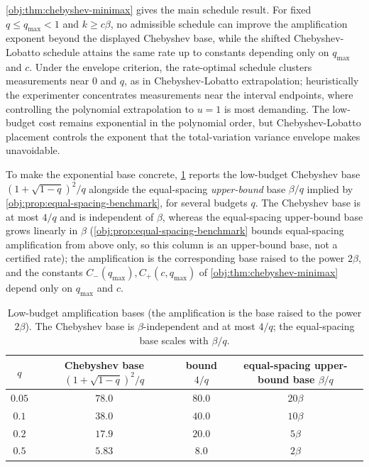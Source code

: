 \documentclass[11pt]{article}
\begin{document}
\cref{obj:thm:chebyshev-minimax} gives the main schedule result. For fixed \(q\le q_{\max}<1\) and \(k\ge c\beta\), no admissible schedule can improve the amplification exponent beyond the displayed Chebyshev base, while the shifted Chebyshev-Lobatto schedule attains the same rate up to constants depending only on \(q_{\max}\) and \(c\). Under the envelope criterion, the rate-optimal schedule clusters measurements near \(0\) and \(q\), as in Chebyshev-Lobatto extrapolation; heuristically the experimenter concentrates measurements near the interval endpoints, where controlling the polynomial extrapolation to \(u=1\) is most demanding. The low-budget cost remains exponential in the polynomial order, but Chebyshev-Lobatto placement controls the exponent that the total-variation variance envelope makes unavoidable.

To make the exponential base concrete, \cref{tab:rate-base} reports the low-budget Chebyshev base \((1+\sqrt{1-q})^2/q\) alongside the equal-spacing \emph{upper-bound} base \(\beta/q\) implied by \cref{obj:prop:equal-spacing-benchmark}, for several budgets \(q\). The Chebyshev base is at most \(4/q\) and is independent of \(\beta\), whereas the equal-spacing upper-bound base grows linearly in \(\beta\) (\cref{obj:prop:equal-spacing-benchmark} bounds equal-spacing amplification from above only, so this column is an upper-bound base, not a certified rate); the amplification is the corresponding base raised to the power \(2\beta\), and the constants \(C_-(q_{\max}),C_+(c,q_{\max})\) of \cref{obj:thm:chebyshev-minimax} depend only on \(q_{\max}\) and \(c\).

\begin{table}[h]
\centering
\begin{tabular}{cccc}
\hline
\(q\) & Chebyshev base \((1+\sqrt{1-q})^2/q\) & bound \(4/q\) & equal-spacing upper-bound base \(\beta/q\) \\
\hline
\(0.05\) & \(78.0\) & \(80.0\) & \(20\beta\) \\
\(0.1\) & \(38.0\) & \(40.0\) & \(10\beta\) \\
\(0.2\) & \(17.9\) & \(20.0\) & \(5\beta\) \\
\(0.5\) & \(5.83\) & \(8.0\) & \(2\beta\) \\
\hline
\end{tabular}
\caption{Low-budget amplification bases (the amplification is the base raised to the power \(2\beta\)). The Chebyshev base is \(\beta\)-independent and at most \(4/q\); the equal-spacing base scales with \(\beta/q\).}
\label{tab:rate-base}
\end{table}
\end{document}
